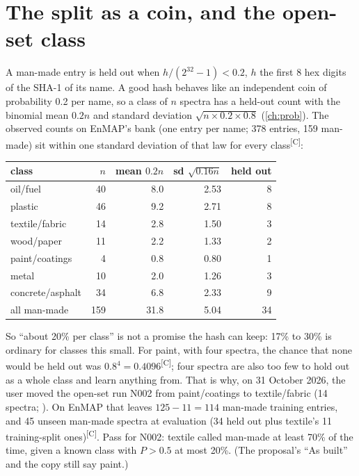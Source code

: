 \documentclass[11pt,a4paper,oneside,openany]{book}
\newcommand{\comp}{\textsuperscript{\textsf{\scriptsize[C]}}}
\begin{document}
\section{The split as a coin, and the open-set class}

A man-made entry is held out when $h/(2^{32}-1)<0.2$, $h$ the first 8 hex digits of the SHA-1 of its name. A good hash behaves like an independent coin of probability 0.2 per
name, so a class of $n$ spectra has a held-out count with the binomial mean $0.2n$ and standard deviation $\sqrt{n\times0.2\times0.8}$ (\cref{ch:prob}). The observed counts on
EnMAP's bank (one entry per name; 378 entries, 159 man-made) sit within one standard deviation of that law for every class\comp:
\begin{center}\small
\begin{tabular}{@{}lrrrr@{}}
\toprule
class & $n$ & mean $0.2n$ & sd $\sqrt{0.16n}$ & held out\\
\midrule
oil/fuel & 40 & 8.0 & 2.53 & 8\\
plastic & 46 & 9.2 & 2.71 & 8\\
textile/fabric & 14 & 2.8 & 1.50 & 3\\
wood/paper & 11 & 2.2 & 1.33 & 2\\
paint/coatings & 4 & 0.8 & 0.80 & 1\\
metal & 10 & 2.0 & 1.26 & 3\\
concrete/asphalt & 34 & 6.8 & 2.33 & 9\\
\midrule
all man-made & 159 & 31.8 & 5.04 & 34\\
\bottomrule
\end{tabular}
\end{center}
So ``about 20\% per class'' is not a promise the hash can keep: 17\% to 30\% is ordinary for classes this small. For paint, with four spectra, the chance that none would be held
out was $0.8^4=0.4096$\comp; four spectra are also too few to hold out as a whole class and learn anything from. That is why, on 31 October 2026, the user moved the open-set
run N002 from paint/coatings to textile/fabric (14 spectra; ). On EnMAP that leaves $125-11=114$ man-made training entries, and 45 unseen
man-made spectra at evaluation (34 held out plus textile's 11 training-split ones)\comp. Pass for N002: textile called man-made at least 70\% of the time, given a known class with
$P>0.5$ at most 20\%. (The proposal's ``As built'' and the copy  still say paint.)
\end{document}
